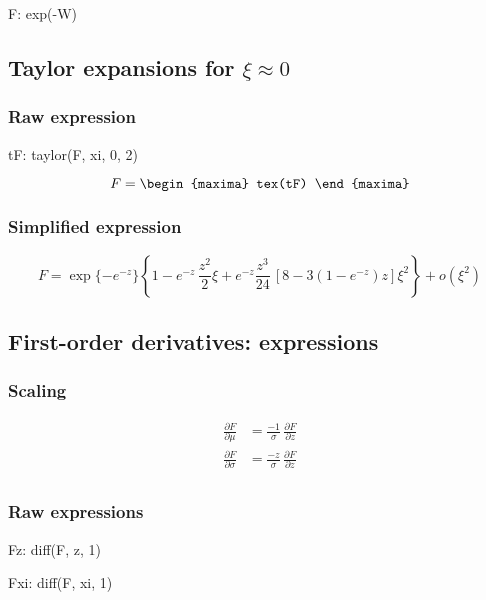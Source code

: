 \begin{maxima}
  F: exp(-W)
\end{maxima}

\subsection{Taylor expansions for $\xi \approx 0$}
\subsubsection*{Raw expression}

\begin{maxima}
  tF: taylor(F, xi, 0, 2)
\end{maxima}

{\color{MonVertF}  
\begin{equation*}
  F =
  \begin{maxima}
    tex(tF)
  \end{maxima}
\end{equation*}
}
\subsubsection*{Simplified expression}
{\color{red}
$$
F = \exp\{-e^{-z}\} \left\{ 1 - e^{-z} \,\frac{z^2}{2} \xi +
  e^{-z} \frac{z^3}{24} \,\left[ 8 - 3 (1 - e^{-z}) z \right] \xi^2 \right\} +
  o(\xi^2)
$$}

\subsection{First-order derivatives: expressions}

\subsubsection*{Scaling}

\begin{align*}
  \frac{\partial F}{\partial \mu}
  &= \frac{-1}{\sigma} \,\frac{\partial F}{\partial z}\\
  \frac{\partial F}{\partial \sigma}
  &= \frac{-z}{\sigma} \,\frac{\partial F}{\partial z}\\
\end{align*}

\subsubsection*{Raw expressions}

\begin{maxima}
  Fz: diff(F, z, 1)
\end{maxima}%
\begin{maxima}
  Fxi: diff(F, xi, 1)
\end{maxima}%

